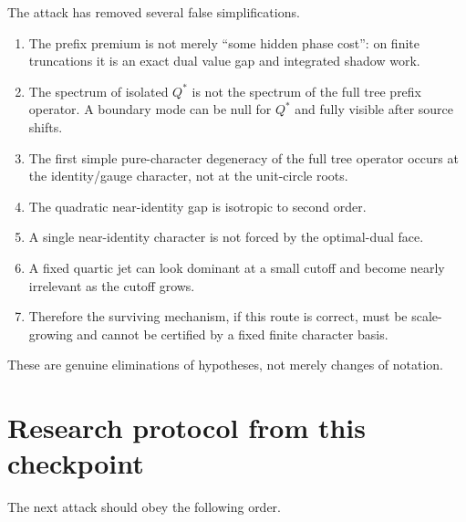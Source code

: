 \documentclass[11pt,a4paper]{article}
\begin{document}
The attack has removed several false simplifications.

\begin{enumerate}
\item
The prefix premium is not merely ``some hidden phase cost'':
on finite truncations it is an exact dual value gap and integrated shadow
work.

\item
The spectrum of isolated \(Q^*\) is not the spectrum of the full tree prefix
operator.
A boundary mode can be null for \(Q^*\) and fully visible after source shifts.

\item
The first simple pure-character degeneracy of the full tree operator occurs
at the identity/gauge character, not at the unit-circle roots.

\item
The quadratic near-identity gap is isotropic to second order.

\item
A single near-identity character is not forced by the optimal-dual face.

\item
A fixed quartic jet can look dominant at a small cutoff and become nearly
irrelevant as the cutoff grows.

\item
Therefore the surviving mechanism, if this route is correct, must be
scale-growing and cannot be certified by a fixed finite character basis.
\end{enumerate}

These are genuine eliminations of hypotheses, not merely changes of notation.

\section{Research protocol from this checkpoint}

The next attack should obey the following order.
\end{document}
